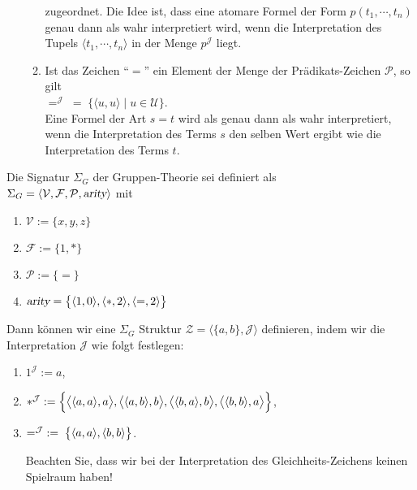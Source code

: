 \begin{Definition}[Struktur]
\begin{enumerate}
\begin{enumerate}
              zugeordnet.  Die Idee ist, dass eine atomare Formel der Form $p(t_1, \cdots, t_n)$
              genau dann als wahr interpretiert wird, wenn die Interpretation des Tupels
              $\langle t_1, \cdots, t_n \rangle$ in der Menge $p^\mathcal{J}$ liegt.
        \item Ist das Zeichen ``$=$'' ein Element der Menge der Pr\"{a}dikats-Zeichen $\mathcal{P}$, so gilt
              \\[0.2cm]
              \hspace*{1.3cm}  
              $=^\mathcal{J} \;=\; \bigl\{ \langle u, u \rangle \mid u \in \mathcal{U} \bigr\}$.
              \\[0.2cm]
              Eine Formel der Art $s = t$ wird als genau dann als wahr interpretiert, 
              wenn die Interpretation des Terms $s$ den selben Wert ergibt wie die Interpretation des Terms $t$.
              \eox
        \end{enumerate}
    \end{enumerate}
\end{Definition}

\example
Die Signatur  $\Sigma_G$ der Gruppen-Theorie sei definiert als \\[0.2cm]
\hspace*{1.3cm} $\Sigma_G = \langle \mathcal{V}, \mathcal{F}, \mathcal{P},\textsl{arity}\rangle$ 
\quad mit
\begin{enumerate}
\item $\mathcal{V} := \{ x, y, z \}$
\item $\mathcal{F} := \{ 1, * \}$
\item $\mathcal{P} := \{ \mathtt{=} \}$
\item $\textsl{arity} = \bigl\{ \pair(1,0), \pair(*,2), \pair(\mathtt{=},2)\bigr\}$
\end{enumerate}
Dann k\"{o}nnen wir eine $\Sigma_G$ Struktur $\mathcal{Z} = \langle \{a,
b\},\mathcal{J}\rangle$ definieren, 
indem wir die Interpretation $\mathcal{J}$ 
wie folgt festlegen:
\begin{enumerate}
\item $1^\mathcal{J} := a$,
\item $*^\mathcal{J} := \Bigl\{ \bigl\langle\pair(a,a), a\bigr\rangle,
                                   \bigl\langle\pair(a,b), b\bigr\rangle,
                                   \bigl\langle\pair(b,a), b\bigr\rangle,
                                   \bigl\langle\pair(b,b), a\bigr\rangle \Bigr\}$,
\item $=^\mathcal{J} \;:=\; \bigl\{ \pair(a,a), \pair(b,b) \bigr\}$.
                                 
      Beachten Sie, dass wir bei der Interpretation des Gleichheits-Zeichens 
      keinen Spielraum haben! \eox
\end{enumerate}

